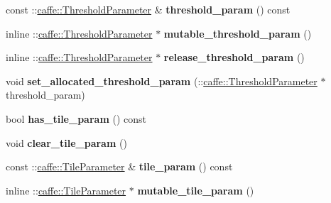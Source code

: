 \begin{DoxyCompactItemize}
\mbox{\label{classcaffe_1_1_layer_parameter_a8c031dab072c02d0564008c0fbc280d3}} 
const \+::\mbox{\hyperlink{classcaffe_1_1_threshold_parameter}{caffe\+::\+Threshold\+Parameter}} \& {\bfseries threshold\+\_\+param} () const
\item 
\mbox{\label{classcaffe_1_1_layer_parameter_a8296753e4d56877edfac0b22c7d176a0}} 
inline \+::\mbox{\hyperlink{classcaffe_1_1_threshold_parameter}{caffe\+::\+Threshold\+Parameter}} $\ast$ {\bfseries mutable\+\_\+threshold\+\_\+param} ()
\item 
\mbox{\label{classcaffe_1_1_layer_parameter_ac7b77b5e899ca0f414b3f288d5214bc6}} 
inline \+::\mbox{\hyperlink{classcaffe_1_1_threshold_parameter}{caffe\+::\+Threshold\+Parameter}} $\ast$ {\bfseries release\+\_\+threshold\+\_\+param} ()
\item 
\mbox{\label{classcaffe_1_1_layer_parameter_a36f91de983767035d4661fe4b1f18554}} 
void {\bfseries set\+\_\+allocated\+\_\+threshold\+\_\+param} (\+::\mbox{\hyperlink{classcaffe_1_1_threshold_parameter}{caffe\+::\+Threshold\+Parameter}} $\ast$threshold\+\_\+param)
\item 
\mbox{\label{classcaffe_1_1_layer_parameter_a9de64522c08f7933a3b137c6c1966397}} 
bool {\bfseries has\+\_\+tile\+\_\+param} () const
\item 
\mbox{\label{classcaffe_1_1_layer_parameter_acc3401bf6f09b63cf19bda3c53a619f9}} 
void {\bfseries clear\+\_\+tile\+\_\+param} ()
\item 
\mbox{\label{classcaffe_1_1_layer_parameter_a895188288994e3bec95434b881decb95}} 
const \+::\mbox{\hyperlink{classcaffe_1_1_tile_parameter}{caffe\+::\+Tile\+Parameter}} \& {\bfseries tile\+\_\+param} () const
\item 
\mbox{\label{classcaffe_1_1_layer_parameter_a3e22926eb60c9df821c7f1028bad27df}} 
inline \+::\mbox{\hyperlink{classcaffe_1_1_tile_parameter}{caffe\+::\+Tile\+Parameter}} $\ast$ {\bfseries mutable\+\_\+tile\+\_\+param} ()
\item 

\end{DoxyCompactItemize}
